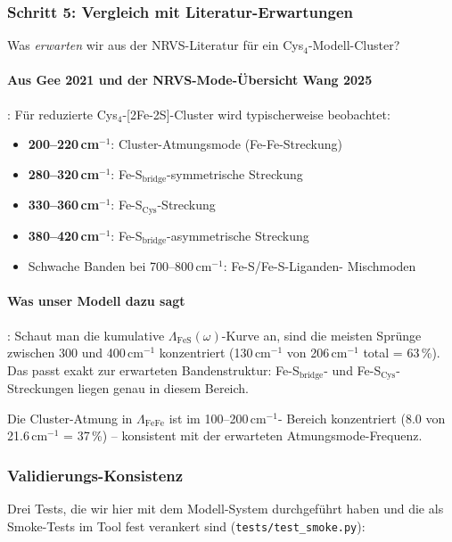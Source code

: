 \documentclass[11pt,a4paper,twoside]{article}
\theoremstyle{remark}
\begin{document}
\subsubsection*{Schritt 5: Vergleich mit Literatur-Erwartungen}

Was \emph{erwarten} wir aus der NRVS-Literatur f\"ur ein
Cys$_4$-Modell-Cluster?

\paragraph{Aus Gee 2021 \cite{Gee2021} und der NRVS-Mode-\"Ubersicht
Wang 2025 \cite{Wang2025}}:
F\"ur reduzierte Cys$_4$-[2Fe-2S]-Cluster wird typischerweise
beobachtet:
\begin{itemize}\setlength{\itemsep}{0pt}
  \item \textbf{200--220\,cm$^{-1}$}: Cluster-Atmungsmode
        (Fe-Fe-Streckung)
  \item \textbf{280--320\,cm$^{-1}$}: Fe-S$_\text{bridge}$-symmetrische
        Streckung
  \item \textbf{330--360\,cm$^{-1}$}: Fe-S$_\text{Cys}$-Streckung
  \item \textbf{380--420\,cm$^{-1}$}: Fe-S$_\text{bridge}$-asymmetrische
        Streckung
  \item Schwache Banden bei 700--800\,cm$^{-1}$: Fe-S/Fe-S-Liganden-
        Mischmoden
\end{itemize}

\paragraph{Was unser Modell dazu sagt}: Schaut man die kumulative
$\Lambda_\text{FeS}(\omega)$-Kurve an, sind die meisten Spr\"unge zwischen
300 und 400\,cm$^{-1}$ konzentriert (130\,cm$^{-1}$ von 206\,cm$^{-1}$
total = 63\,\%). Das passt exakt zur erwarteten Bandenstruktur:
Fe-S$_\text{bridge}$- und Fe-S$_\text{Cys}$-Streckungen liegen genau
in diesem Bereich.

Die Cluster-Atmung in $\Lambda_\text{FeFe}$ ist im 100--200\,cm$^{-1}$-
Bereich konzentriert (8.0 von 21.6\,cm$^{-1}$ = 37\,\%) -- konsistent
mit der erwarteten Atmungsmode-Frequenz.

\subsubsection*{Validierungs-Konsistenz}

Drei Tests, die wir hier mit dem Modell-System durchgef\"uhrt haben
und die als Smoke-Tests im Tool fest verankert sind
(\texttt{tests/test\_smoke.py}):
\end{document}
